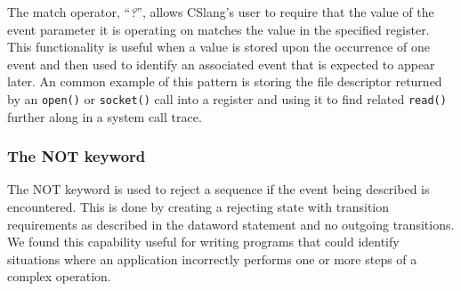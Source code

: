 The match operator, ``\textit{?}'', allows CSlang's user to
require that the value of the event parameter it is operating on matches
the value in the specified register.  This functionality is
useful when a value is stored upon the occurrence of one event
and then used to identify an associated event that is expected to appear later.
An common example of this pattern is storing the file descriptor
returned by an {\tt open()} or {\tt socket()} call into a register
and using it to find related {\tt read()} further along in a system call
trace.

\subsubsection{The NOT keyword}

The NOT keyword is used to reject a sequence if the event being
described is encountered.  This is done by creating a rejecting state with
transition requirements as described in the dataword
statement and no outgoing transitions.
We found this capability useful for writing programs that could identify
situations where an application incorrectly performs one or more steps of a
complex operation.




